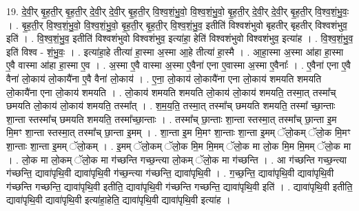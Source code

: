 \documentclass[17pt]{extarticle}
\begin{document}
19. दे॒वी॒र् बृ॒ह॒ती॒र् बृ॒ह॒ती॒र् दे॒वी॒र् दे॒वी॒र् बृ॒ह॒ती॒र् वि॒श्व॒शं॒भु॒वो॒ वि॒श्व॒शं॒भु॒वो॒ बृ॒ह॒ती॒र् दे॒वी॒र् दे॒वी॒र् बृ॒ह॒ती॒र् वि॒श्व॒शं॒भु॒वः॒ । . बृ॒ह॒ती॒र् वि॒श्व॒शं॒भु॒वो॒ वि॒श्व॒शं॒भु॒वो॒ बृ॒ह॒ती॒र् बृ॒ह॒ती॒र् वि॒श्व॒शं॒भु॒व॒ इतीति॑ विश्वशंभुवो बृहतीर् बृहतीर् विश्वशंभुव॒ इति॑ । . वि॒श्व॒शं॒भु॒व॒ इतीति॑ विश्वशंभुवो विश्वशंभुव॒ इत्या॑हा॒ हेति॑ विश्वशंभुवो विश्वशंभुव॒ इत्या॑ह । . वि॒श्व॒शं॒भु॒व॒ इति॑ विश्व - शं॒भु॒वः॒ । . इत्या॑हा॒हे तीत्या॑ हा॒स्मा अ॒स्मा आ॒हे तीत्या॑ हा॒स्मै । . आ॒हा॒स्मा अ॒स्मा आ॑हा हा॒स्मा ए॒वै वास्मा आ॑हा हा॒स्मा ए॒व । . अ॒स्मा ए॒वै वास्मा अ॒स्मा ए॒वैना॑ एना ए॒वास्मा अ॒स्मा ए॒वैनाः᳚ । . ए॒वैना॑ एना ए॒वै वैना॑ लो॒काय॑ लो॒कायै॑ना ए॒वै वैना॑ लो॒काय॑ । . ए॒ना॒ लो॒काय॑ लो॒कायै॑ना एना लो॒काय॑ शमयति शमयति लो॒कायै॑ना एना लो॒काय॑ शमयति । . लो॒काय॑ शमयति शमयति लो॒काय॑ लो॒काय॑ शमयति॒ तस्मा॒त् तस्मा᳚च् छमयति लो॒काय॑ लो॒काय॑ शमयति॒ तस्मा᳚त् । . श॒म॒य॒ति॒ तस्मा॒त् तस्मा᳚च् छमयति शमयति॒ तस्मा᳚ च्छा॒न्ताः शा॒न्ता स्तस्मा᳚च् छमयति शमयति॒ तस्मा᳚च्छा॒न्ताः । . तस्मा᳚च् छा॒न्ताः शा॒न्ता स्तस्मा॒त् तस्मा᳚च् छा॒न्ता इ॒म मि॒मꣳ शा॒न्ता स्तस्मा॒त् तस्मा᳚च् छा॒न्ता इ॒मम् । . शा॒न्ता इ॒म मि॒मꣳ शा॒न्ताः शा॒न्ता इ॒मम् ॅलो॒कम् ॅलो॒क मि॒मꣳ शा॒न्ताः शा॒न्ता इ॒मम् ॅलो॒कम् । . इ॒मम् ॅलो॒कम् ॅलो॒क मि॒म मि॒मम् ॅलो॒क मा लो॒क मि॒म मि॒मम् ॅलो॒क मा । . लो॒क मा लो॒कम् ॅलो॒क मा ग॑च्छन्ति गच्छ॒न्त्या लो॒कम् ॅलो॒क मा ग॑च्छन्ति । . आ ग॑च्छन्ति गच्छ॒न्त्या ग॑च्छन्ति॒ द्यावा॑पृथि॒वी द्यावा॑पृथि॒वी ग॑च्छ॒न्त्या ग॑च्छन्ति॒ द्यावा॑पृथि॒वी । . ग॒च्छ॒न्ति॒ द्यावा॑पृथि॒वी द्यावा॑पृथि॒वी ग॑च्छन्ति गच्छन्ति॒ द्यावा॑पृथि॒वी इतीति॒ द्यावा॑पृथि॒वी ग॑च्छन्ति गच्छन्ति॒ द्यावा॑पृथि॒वी इति॑ । . द्यावा॑पृथि॒वी इतीति॒ द्यावा॑पृथि॒वी द्यावा॑पृथि॒वी इत्या॑हा॒हेति॒ द्यावा॑पृथि॒वी द्यावा॑पृथि॒वी इत्या॑ह । \newline
\end{document}
